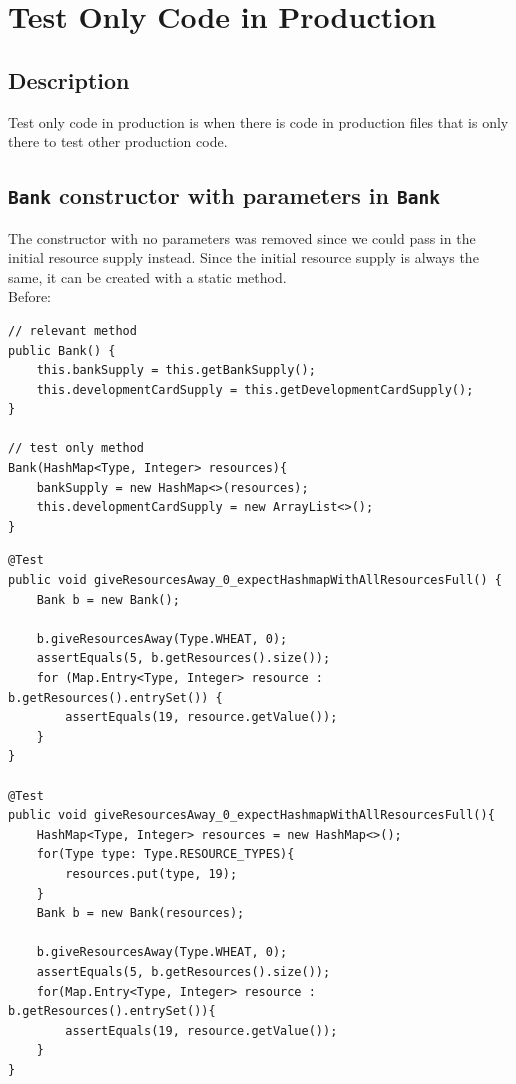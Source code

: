 \documentclass{fank1basedocument}
\begin{document}
\tableofcontents

\section*{Test Only Code in Production}
\subsection*{Description}
Test only code in production is when there is code in production files that is only there to test other production code.
\subsection*{\texttt{Bank} constructor with parameters in \texttt{Bank}}
The constructor with no parameters was removed since we could pass in the initial resource supply instead. Since the initial resource supply is always the same, it can be created with a static method.\\

Before:
\begin{lstlisting}[style=javacode,language=myJava]
// relevant method
public Bank() {
	this.bankSupply = this.getBankSupply();
	this.developmentCardSupply = this.getDevelopmentCardSupply();
}

// test only method
Bank(HashMap<Type, Integer> resources){
	bankSupply = new HashMap<>(resources);
	this.developmentCardSupply = new ArrayList<>();
}
\end{lstlisting}
\begin{lstlisting}[style=javacode,language=myJava]
@Test
public void giveResourcesAway_0_expectHashmapWithAllResourcesFull() {
	Bank b = new Bank();

	b.giveResourcesAway(Type.WHEAT, 0);
	assertEquals(5, b.getResources().size());
	for (Map.Entry<Type, Integer> resource : b.getResources().entrySet()) {
		assertEquals(19, resource.getValue());
	}
}

@Test
public void giveResourcesAway_0_expectHashmapWithAllResourcesFull(){
	HashMap<Type, Integer> resources = new HashMap<>();
	for(Type type: Type.RESOURCE_TYPES){
		resources.put(type, 19);
	}
	Bank b = new Bank(resources);

	b.giveResourcesAway(Type.WHEAT, 0);
	assertEquals(5, b.getResources().size());
	for(Map.Entry<Type, Integer> resource : b.getResources().entrySet()){
		assertEquals(19, resource.getValue());
	}
}
\end{lstlisting}
\end{document}

